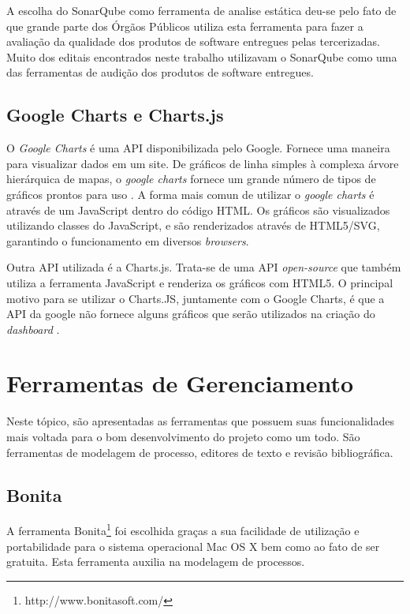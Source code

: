 A escolha do SonarQube como ferramenta de analise estática deu-se pelo fato de que grande parte dos Órgãos Públicos utiliza esta ferramenta para fazer a avaliação da qualidade dos produtos de software entregues pelas tercerizadas. Muito dos editais encontrados neste trabalho utilizavam o SonarQube como uma das ferramentas de audição dos produtos de software entregues.

	
	\subsection{Google Charts e Charts.js}
	\label{sub:google_charts_chartsjs}
	O \textit{Google Charts} é uma API disponibilizada pelo Google. Fornece uma maneira para visualizar dados em um site. De gráficos de linha simples à complexa árvore hierárquica de mapas, o \textit{google charts} fornece um grande número de tipos de gráficos prontos para uso \cite{google_charts}. A forma mais comun de utilizar o \textit{google charts} é através de um JavaScript dentro do código HTML. Os gráficos são visualizados utilizando classes do JavaScript, e são renderizados através de HTML5/SVG, garantindo o funcionamento em diversos \textit{browsers}. 

Outra API utilizada é a Charts.js. Trata-se de uma API \textit{open-source} que também utiliza a ferramenta JavaScript e renderiza os gráficos com HTML5. O principal motivo para se utilizar o Charts.JS, juntamente com o Google Charts, é que a API da google não fornece alguns gráficos que serão utilizados na criação do \textit{dashboard} \cite{chartsjs}.
	
\section{Ferramentas de Gerenciamento}
Neste tópico, são apresentadas as ferramentas que possuem suas funcionalidades mais voltada para o bom desenvolvimento do projeto como um todo. São ferramentas de modelagem de processo, editores de texto e revisão bibliográfica. 

	\subsection{Bonita} %
	\label{sub:Bonita}
		 A ferramenta Bonita\footnote{http://www.bonitasoft.com/} foi escolhida graças a sua facilidade de utilização e portabilidade para o sistema operacional Mac OS X bem como ao fato de ser gratuita. Esta ferramenta auxilia na modelagem de processos.

